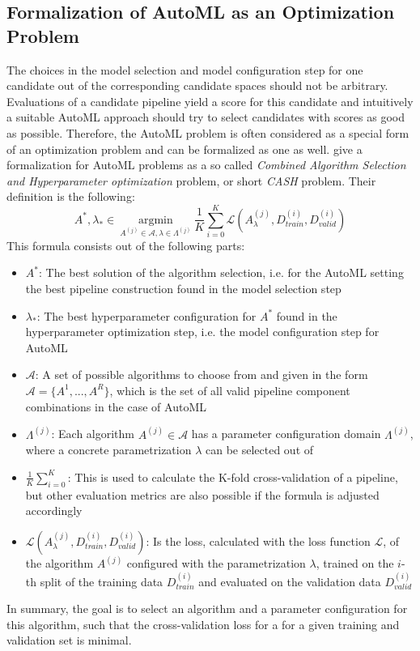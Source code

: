 \subsection{Formalization of AutoML as an Optimization Problem}
\label{sec:theory:automl:optimization}
The choices in the model selection and model configuration step for one candidate out of the corresponding candidate spaces should not be arbitrary.
Evaluations of a candidate pipeline yield a score for this candidate and intuitively a suitable AutoML approach should try to select candidates with scores as good as possible.
Therefore, the AutoML problem is often considered as a special form of an optimization problem and can be formalized as one as well.\newline
\textcite{Feurer-Cash} give a formalization for AutoML problems as a so called \textit{Combined Algorithm Selection and Hyperparameter optimization} problem, or short \textit{CASH} problem.
Their definition is the following:
\begin{equation*}
    A^*, \lambda_* \in \> \underset{A^{(j)} \in \mathcal{A},\lambda \in \Lambda^{(j)}}{\mathrm{argmin}} \> \frac{1}{K} \sum_{i=0}^K \mathcal{L} (A_\lambda^{(j)}, D_{\textit{train}}^{(i)}, D_{\textit{valid}}^{(i)})
\end{equation*}
This formula consists out of the following parts:
\begin{itemize}
    \item $A^*$: The best solution of the algorithm selection, i.e. for the AutoML setting the best pipeline construction found in the model selection step
    \item $\lambda_*$: The best hyperparameter configuration for $A^*$ found in the hyperparameter optimization step, i.e. the model configuration step for AutoML
    \item $\mathcal{A}$: A set of possible algorithms to choose from and given in the form $\mathcal{A} = \{A^{1}, ..., A^{R} \}$, which is the set of all valid pipeline component combinations in the case of AutoML
    \item $\Lambda^{(j)}$: Each algorithm $A^{(j)} \in \mathcal{A}$ has a parameter configuration domain $\Lambda^{(j)}$, where a concrete parametrization $\lambda$ can be selected out of
    \item $\frac{1}{K} \sum_{i=0}^K $: This is used to calculate the K-fold cross-validation of a pipeline, but other evaluation metrics are also possible if the formula is adjusted accordingly
    \item $\mathcal{L} (A_\lambda^{(j)}, D_{\textit{train}}^{(i)}, D_{\textit{valid}}^{(i)})$: Is the loss, calculated with the loss function $\mathcal{L}$, of the algorithm $A^{(j)}$ configured with the parametrization $\lambda$, trained on the $i$-th split of the training data $D_{\textit{train}}^{(i)}$ and evaluated on the validation data $D_{\textit{valid}}^{(i)}$
\end{itemize}
In summary, the goal is to select an algorithm and a parameter configuration for this algorithm, such that the cross-validation loss for a for a given training and validation set is minimal.

